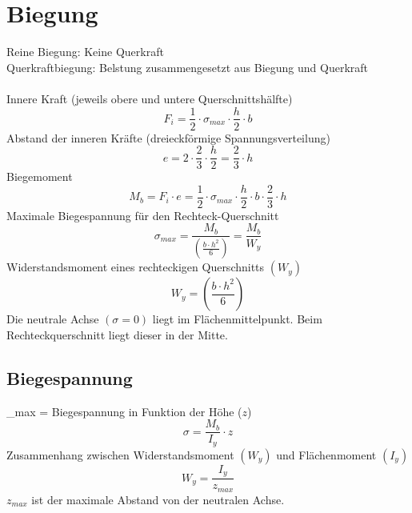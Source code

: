 



\section{Biegung}
Reine Biegung: Keine Querkraft\\
Querkraftbiegung: Belstung zusammengesetzt aus Biegung und Querkraft\\\\
Innere Kraft (jeweils obere und untere Querschnittshälfte)
\[ F_i = \frac{1}{2} \cdot \sigma_{max} \cdot \frac{h}{2} \cdot b \]
Abstand der inneren Kräfte (dreieckförmige Spannungsverteilung)
\[ e = 2 \cdot \frac{2}{3} \cdot \frac{h}{2} = \frac{2}{3} \cdot h \]
Biegemoment
\[ M_b = F_i \cdot e = \frac{1}{2} \cdot \sigma_{max} \cdot \frac{h}{2} \cdot b \cdot \frac{2}{3} \cdot h \]
Maximale Biegespannung für den Rechteck-Querschnitt
\[ \sigma_{max} = \frac{M_b}{\left(\frac{b \cdot h^2}{6}\right)} = \frac{M_b}{W_y} \]
Widerstandsmoment eines rechteckigen Querschnitts $(W_y)$
\[ W_y = \left(\frac{b \cdot h^2}{6}\right) \]
Die neutrale Achse $(\sigma = 0)$ liegt im Flächenmittelpunkt. Beim Rechteckquerschnitt liegt dieser in der Mitte. 

\subsection{Biegespannung}
\sigma_{max} = 
Biegespannung in Funktion der Höhe ($z$)
\[ \sigma = \frac{M_b}{I_y} \cdot z \]
Zusammenhang zwischen Widerstandsmoment $(W_y)$ und Flächenmoment $(I_y)$
\[ W_y = \frac{I_y}{z_{max}} \]
$z_{max}$ ist der maximale Abstand von der neutralen Achse. 